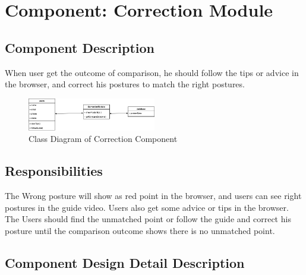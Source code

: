 \documentclass[16pt]{scrreprt}
\begin{document}
\section{Component: Correction Module}
\subsection{Component Description}
When user get the outcome of comparison, he should follow the tips or advice in the browser, and correct his postures to match the right postures.

\begin{figure}[H]
	\centering
	\includegraphics[width=0.5\textwidth]{diagrams/class-correction.png}
	\caption{Class Diagram of Correction Component}
\end{figure}

\subsection{Responsibilities}
The Wrong posture will show as red point in the browser, and users can see right postures in the guide video. Users also get some advice or tips in the browser.\\ 
The Users should find the unmatched point or follow the guide and correct his posture until the comparison outcome shows there is no unmatched point.

\subsection{Component Design Detail Description}
\end{document}
